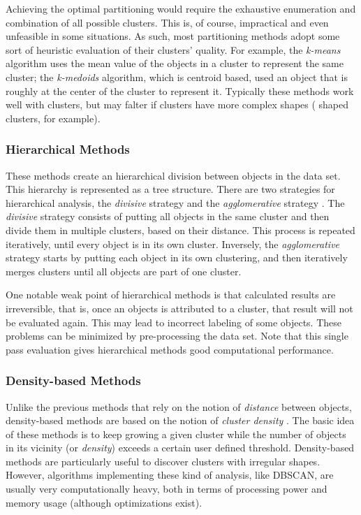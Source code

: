 Achieving the optimal partitioning would require the exhaustive enumeration and
combination of all possible clusters. This is, of course, impractical and even
unfeasible in some situations. As such, most partitioning methods adopt some
sort of heuristic evaluation of their clusters' quality. For example, the
\emph{k-means} algorithm uses the mean value of the objects in a cluster to
represent the same cluster; the \emph{k-medoids} algorithm, which is
centroid based, used an object that is roughly at the center of the cluster to
represent it. Typically these methods work well with  clusters,
but may falter if clusters have more complex shapes ( shaped
clusters, for example).

\subsubsection*{Hierarchical Methods}

These methods create an hierarchical division between objects in the data set.
This hierarchy is represented as a tree structure. There are two strategies for
hierarchical analysis, the \emph{divisive} strategy and the \emph{agglomerative}
strategy \cite{han2006data}. The \emph{divisive} strategy consists of putting
all objects in the same cluster and then divide them in multiple clusters, based
on their distance. This process is repeated iteratively, until every object is
in its own cluster. Inversely, the \emph{agglomerative} strategy starts by
putting each object in its own clustering, and then iteratively merges clusters
until all objects are part of one cluster.

One notable weak point of hierarchical methods is that calculated results are
irreversible, that is, once an objects is attributed to a cluster, that result
will not be evaluated again. This may lead to incorrect labeling of some
objects. These problems can be minimized by pre-processing the data set. Note
that this single pass evaluation gives hierarchical methods good computational
performance.

\subsubsection*{Density-based Methods}

Unlike the previous methods that rely on the notion of \emph{distance} between
objects, density-based methods are based on the notion of \emph{cluster density}
\cite{han2006data}. The basic idea of these methods is to keep growing a given
cluster while the number of objects in its vicinity (or \emph{density}) exceeds
a certain user defined threshold. Density-based methods are particularly useful
to discover clusters with irregular shapes. However, algorithms implementing
these kind of analysis, like DBSCAN, are usually very computationally heavy,
both in terms of processing power and memory usage (although optimizations
exist).

